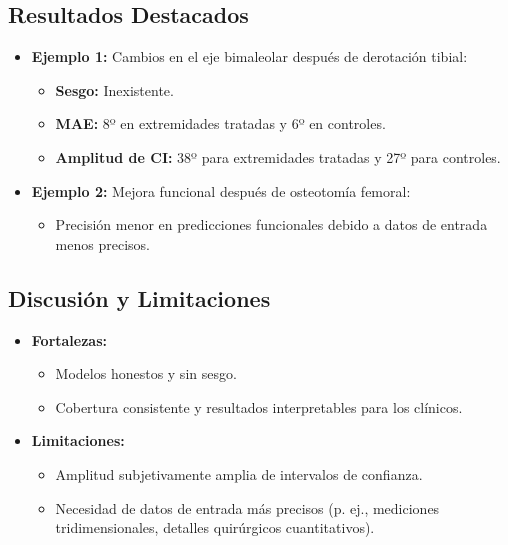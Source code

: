\documentclass{report}
\begin{document}
\subsection{Resultados Destacados}
\begin{itemize}
    \item \textbf{Ejemplo 1:} Cambios en el eje bimaleolar después de derotación tibial:
    \begin{itemize}
        \item \textbf{Sesgo:} Inexistente.
        \item \textbf{MAE:} 8º en extremidades tratadas y 6º en controles.
        \item \textbf{Amplitud de CI:} 38º para extremidades tratadas y 27º para controles.
    \end{itemize}
    \item \textbf{Ejemplo 2:} Mejora funcional después de osteotomía femoral:
    \begin{itemize}
        \item Precisión menor en predicciones funcionales debido a datos de entrada menos precisos.
    \end{itemize}
\end{itemize}

\subsection{Discusión y Limitaciones}
\begin{itemize}
    \item \textbf{Fortalezas:}
    \begin{itemize}
        \item Modelos honestos y sin sesgo.
        \item Cobertura consistente y resultados interpretables para los clínicos.
    \end{itemize}
    \item \textbf{Limitaciones:}
    \begin{itemize}
        \item Amplitud subjetivamente amplia de intervalos de confianza.
        \item Necesidad de datos de entrada más precisos (p. ej., mediciones tridimensionales, detalles quirúrgicos cuantitativos).
    \end{itemize}
\end{itemize}
\end{document}
